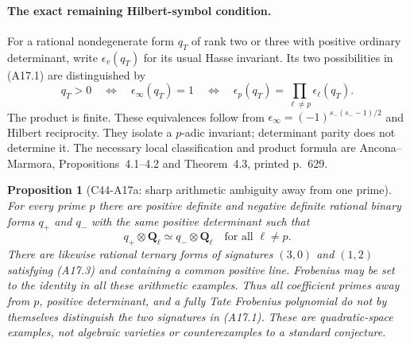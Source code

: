 \documentclass[11pt]{article}
\newtheorem{proposition}[theorem]{Proposition}
\theoremstyle{remark}\newtheorem{remark}[theorem]{Remark}
\begin{document}
\paragraph{The exact remaining Hilbert-symbol condition.}
For a rational nondegenerate form $q_T$ of rank two or
three with positive ordinary determinant, write
$\epsilon_v(q_T)$ for its usual Hasse invariant.
Its two possibilities in (A17.1) are distinguished by
\[
 q_T>0\quad\Longleftrightarrow\quad
 \epsilon_\infty(q_T)=1
 \quad\Longleftrightarrow\quad
 \epsilon_p(q_T)=\prod_{\ell\ne p}\epsilon_\ell(q_T).
 \tag{A17.2}
\]
The product is finite. These equivalences follow from
$\epsilon_\infty=(-1)^{s_-(s_--1)/2}$ and Hilbert reciprocity.
They isolate a $p$-adic invariant; determinant parity does
not determine it. The necessary local classification and
product formula are Ancona--Marmora, Propositions~4.1--4.2
and Theorem~4.3, printed p.~629.

\begin{proposition}[C44-A17a: sharp arithmetic ambiguity away from one prime]
For every prime $p$ there are positive definite and negative
definite rational binary forms $q_+$ and $q_-$ with the same
positive determinant such that
\[
                   q_+\otimes\mathbf Q_\ell\simeq
                   q_-\otimes\mathbf Q_\ell
                         \quad\text{for all }\ell\ne p.
 \tag{A17.3}
\]
There are likewise rational ternary forms of signatures
$(3,0)$ and $(1,2)$ satisfying (A17.3) and containing a
common positive line. Frobenius may be set to the identity
in all these arithmetic examples. Thus all coefficient
primes away from $p$, positive determinant, and a fully
Tate Frobenius polynomial do not by themselves distinguish
the two signatures in (A17.1).
These are quadratic-space examples, not algebraic varieties
or counterexamples to a standard conjecture.
\end{proposition}
\end{document}
